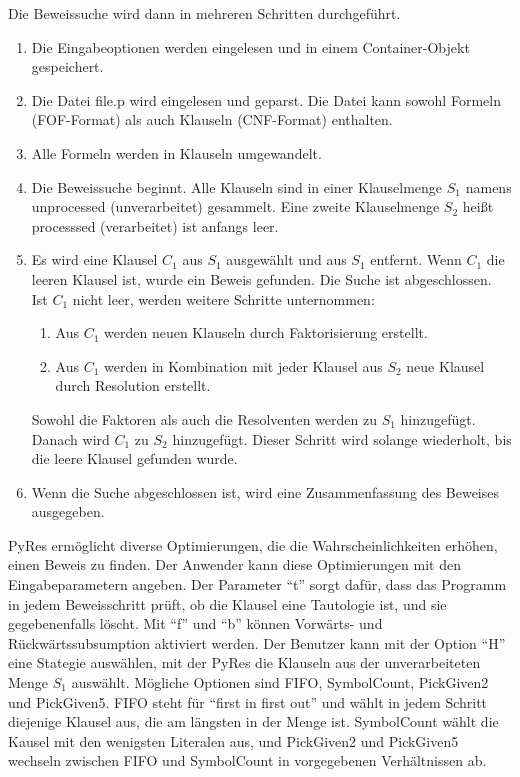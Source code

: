 Die Beweissuche wird dann in mehreren Schritten durchgeführt. 
\begin{enumerate}
	\item Die Eingabeoptionen werden eingelesen und in einem Container-Objekt gespeichert.
	\item Die Datei file.p wird eingelesen und geparst. Die Datei kann sowohl Formeln (FOF-Format) als auch Klauseln (CNF-Format) enthalten.
	\item Alle Formeln werden in Klauseln umgewandelt.
	\item Die Beweissuche beginnt. Alle Klauseln sind in einer Klauselmenge $S_1$ namens unprocessed (unverarbeitet) gesammelt. Eine zweite Klauselmenge $S_2$ heißt processsed (verarbeitet) ist anfangs leer. 
	\item Es wird eine Klausel $C_1$ aus $S_1$ ausgewählt und aus $S_1$ entfernt. Wenn $C_1$ die leeren Klausel ist, wurde ein Beweis gefunden. Die Suche ist abgeschlossen. Ist $C_1$ nicht leer, werden weitere Schritte unternommen:
	\begin{enumerate}
		\item Aus $C_1$ werden neuen Klauseln durch Faktorisierung erstellt.
		\item Aus $C_1$ werden in Kombination mit jeder Klausel aus $S_2$ neue Klausel durch Resolution erstellt.
	\end{enumerate}
	Sowohl die Faktoren als auch die Resolventen werden zu $S_1$ hinzugefügt. Danach wird $C_1$ zu $S_2$ hinzugefügt. Dieser Schritt wird solange wiederholt, bis die leere Klausel gefunden wurde.
	\item Wenn die Suche abgeschlossen ist, wird eine Zusammenfassung des Beweises ausgegeben.
\end{enumerate}
PyRes ermöglicht diverse Optimierungen, die die Wahrscheinlichkeiten erhöhen, einen Beweis zu finden.
Der Anwender kann diese Optimierungen mit den Eingabeparametern angeben. Der Parameter "`t"' sorgt dafür, dass das Programm in jedem Beweisschritt prüft, ob die Klausel eine Tautologie ist, und sie gegebenenfalls löscht. Mit "`f"' und "`b"' können Vorwärts- und Rückwärtssubsumption aktiviert werden.
Der Benutzer kann mit der Option "`H"' eine Stategie auswählen, mit der PyRes die Klauseln aus der unverarbeiteten Menge $S_1$ auswählt. Mögliche Optionen sind FIFO, SymbolCount, PickGiven2 und PickGiven5. FIFO steht für "`first in first out"' und wählt in jedem Schritt diejenige Klausel aus, die am längsten in der Menge ist. SymbolCount wählt die Kausel mit den wenigsten Literalen aus, und PickGiven2 und PickGiven5 wechseln zwischen FIFO und SymbolCount in vorgegebenen Verhältnissen ab.
